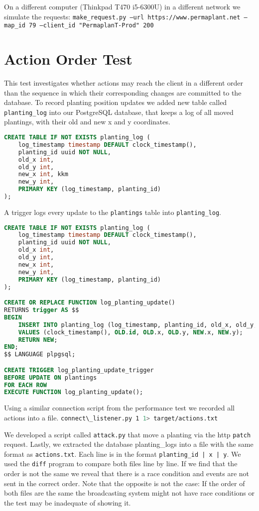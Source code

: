 \documentclass[final,oneside]{vutinfth}
\newcommand{\bashsnippet}[1]{\lstinline[language=bash]{#1}}
\begin{document}
On a different computer (Thinkpad T470 i5-6300U) in a different network we simulate the requests:
\texttt{make\_request.py --url https://www.permaplant.net --map\_id 79 --client\_id "PermaplanT-Prod" 200}

\section{Action Order Test}

This test investigates whether actions may reach the client in a different order than the sequence in which their corresponding changes are committed to the database.
To record planting position updates we added new table called \texttt{planting\_log} into our PostgreSQL database, that keeps a log of all moved plantings, with their old and new x and y coordinates.

\begin{lstlisting}[language=sql]
CREATE TABLE IF NOT EXISTS planting_log (
    log_timestamp timestamp DEFAULT clock_timestamp(),
    planting_id uuid NOT NULL,
    old_x int,
    old_y int,
    new_x int, kkm
    new_y int,
    PRIMARY KEY (log_timestamp, planting_id)
);
\end{lstlisting}

A trigger logs every update to the \texttt{plantings} table into \texttt{planting\_log}.

\begin{lstlisting}[language=sql]
CREATE TABLE IF NOT EXISTS planting_log (
    log_timestamp timestamp DEFAULT clock_timestamp(),
    planting_id uuid NOT NULL,
    old_x int,
    old_y int,
    new_x int,
    new_y int,
    PRIMARY KEY (log_timestamp, planting_id)
);

CREATE OR REPLACE FUNCTION log_planting_update()
RETURNS trigger AS $$
BEGIN
    INSERT INTO planting_log (log_timestamp, planting_id, old_x, old_y, new_x, new_y)
    VALUES (clock_timestamp(), OLD.id, OLD.x, OLD.y, NEW.x, NEW.y);
    RETURN NEW;
END;
$$ LANGUAGE plpgsql;

CREATE TRIGGER log_planting_update_trigger
BEFORE UPDATE ON plantings
FOR EACH ROW
EXECUTE FUNCTION log_planting_update();
\end{lstlisting}

Using a similar connection script from the performance test we recorded all actions into a file. \bashsnippet{connect\_listener.py 1 1> target/actions.txt}

We developed a script called \texttt{attack.py} that move a planting via the \gls{http} \texttt{patch} request.
Lastly, we extracted the database planting\_logs into a file with the same format as \texttt{actions.txt}.
Each line is in the format \texttt{planting\_id | x | y}.
We used the \texttt{diff} program to compare both files line by line.
If we find that the order is not the same we reveal that there is a race condition and events are not sent in the correct order. 
Note that the opposite is not the case: If the order of both files are the same the broadcasting system might not have race conditions or the test may be inadequate of showing it.
\end{document}
